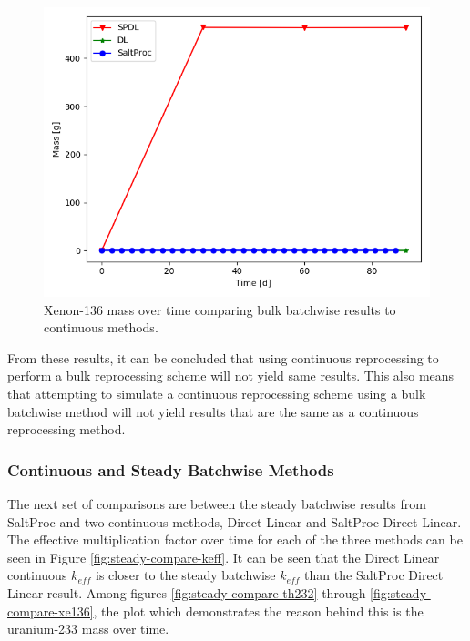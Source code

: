 \begin{figure}[H]
  \centering
  \includegraphics[scale=0.7]{images/soln-3-Xe136.png}
  \caption{Xenon-136 mass over time comparing bulk batchwise results to continuous methods.}
   \label{fig:bulk-comapre-xe136}
\end{figure}

From these results, it can be concluded that using continuous reprocessing to perform a bulk reprocessing scheme will not yield same results. This also means that attempting to simulate a continuous reprocessing scheme using a bulk batchwise method will not yield results that are the same as a continuous reprocessing method.

\subsubsection{Continuous and Steady Batchwise Methods}

The next set of comparisons are between the steady batchwise results from SaltProc and two continuous methods, Direct Linear and SaltProc Direct Linear. The effective multiplication factor over time for each of the three methods can be seen in Figure \ref{fig:steady-compare-keff}. It can be seen that the Direct Linear continuous $k_{eff}$ is closer to the steady batchwise $k_{eff}$ than the SaltProc Direct Linear result. Among figures \ref{fig:steady-compare-th232} through \ref{fig:steady-compare-xe136}, the plot which demonstrates the reason behind this is the uranium-233 mass over time.


